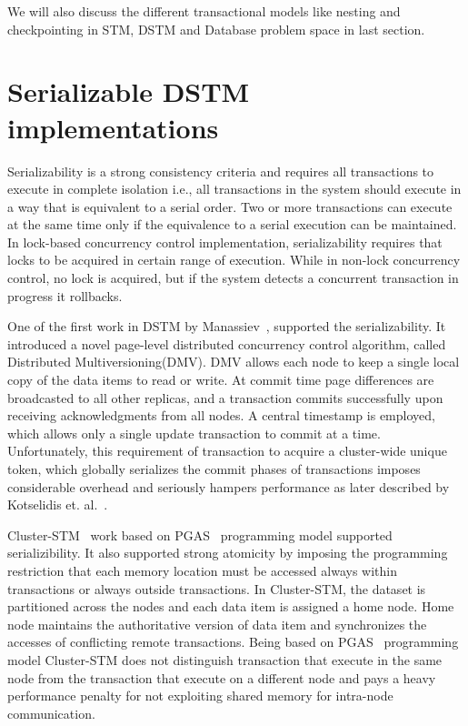 \documentclass[12pt,english]{report}
\begin{document}
We will also discuss the different transactional models like nesting and checkpointing in STM, DSTM and Database problem space in last section. 

\section{Serializable DSTM implementations}

Serializability is a strong consistency criteria and requires all transactions to execute in  complete isolation i.e., all transactions in the system should execute in a way that is equivalent to a serial order. Two or more transactions can execute at the same time only if the equivalence to a serial execution can be maintained. In lock-based concurrency control implementation, serializability requires that locks to be acquired in certain range of execution. While in non-lock concurrency control, no lock is acquired, but if the system detects a concurrent transaction in progress it rollbacks.

One of the first work in DSTM by Manassiev~\cite{Manassiev:2006:EDV:1122971.1123002}, supported the serializability. It introduced a novel page-level distributed concurrency control algorithm, called Distributed Multiversioning(DMV). DMV allows each node to keep a single local copy of the data items to read or write. At commit time page differences are broadcasted to all other replicas, and a transaction commits successfully upon receiving acknowledgments from all nodes. A central timestamp is employed, which allows only a single update transaction to commit at a time. Unfortunately, this requirement of transaction to acquire a cluster-wide unique token, which globally serializes the commit phases of transactions imposes considerable overhead and seriously hampers performance as later described by Kotselidis et. al.~\cite{Kotselidis08distm:a}.

Cluster-STM~\cite{Bocchino:2008:STM:1345206.1345242} work based on PGAS~\cite{PGAS:Programmin:Model} programming model supported serializibility. It also supported strong atomicity by imposing the programming restriction that each memory location must be accessed always within transactions or always outside transactions. In Cluster-STM, the dataset is partitioned across the nodes and each data item is assigned a home node. Home node maintains the authoritative version of data item and synchronizes the accesses of conflicting remote transactions. Being based on PGAS~\cite{PGAS:Programmin:Model} programming model Cluster-STM does not distinguish transaction that execute in the same node from the transaction that execute on a different node and pays a heavy performance penalty for not exploiting shared memory for intra-node communication.
\end{document}

